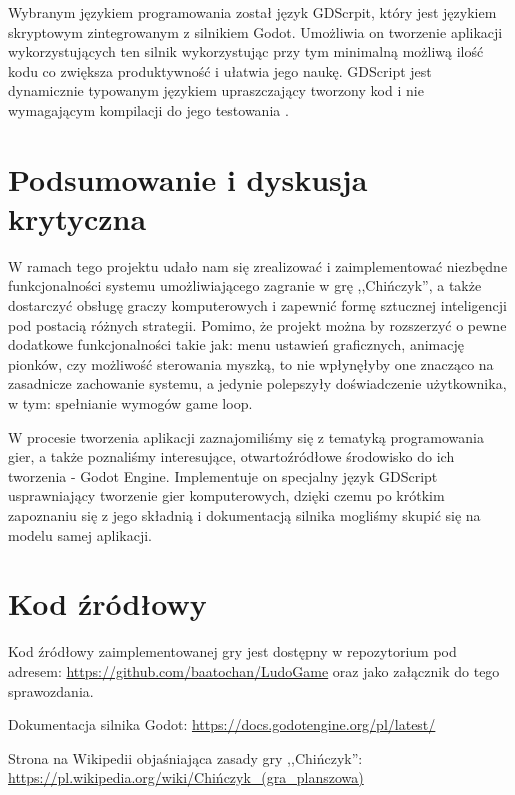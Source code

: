 \documentclass[conference]{IEEEtran}
\begin{document}
Wybranym językiem programowania został język GDScrpit, który jest językiem skryptowym zintegrowanym z silnikiem Godot. Umożliwia on tworzenie aplikacji wykorzystujących ten silnik wykorzystując przy tym minimalną możliwą ilość kodu co zwiększa produktywność i ułatwia jego naukę. GDScript jest dynamicznie typowanym językiem upraszczający tworzony kod i nie wymagającym kompilacji do jego testowania \cite{godot}.

\section{Podsumowanie i dyskusja krytyczna}
W ramach tego projektu udało nam się zrealizować i zaimplementować niezbędne funkcjonalności systemu umożliwiającego zagranie w grę ,,Chińczyk'', a także dostarczyć obsługę graczy komputerowych i zapewnić formę sztucznej inteligencji pod postacią różnych strategii. Pomimo, że projekt można by rozszerzyć o pewne dodatkowe funkcjonalności takie jak: menu ustawień graficznych, animację pionków, czy możliwość sterowania myszką, to nie wpłynęłyby one znacząco na zasadnicze zachowanie systemu, a jedynie polepszyły doświadczenie użytkownika, w tym: spełnianie wymogów game loop.


W procesie tworzenia aplikacji zaznajomiliśmy się z tematyką programowania gier, a także poznaliśmy interesujące, otwartoźródłowe środowisko do ich tworzenia - Godot Engine. Implementuje on specjalny język GDScript usprawniający tworzenie gier komputerowych, dzięki czemu po krótkim zapoznaniu się z jego składnią i dokumentacją silnika mogliśmy skupić się na modelu samej aplikacji.

\section*{Kod źródłowy}
Kod źródłowy zaimplementowanej gry jest dostępny w repozytorium pod adresem: \url{https://github.com/baatochan/LudoGame} oraz jako załącznik do tego sprawozdania.

\newpage

\begin{thebibliography}{00}
Dokumentacja silnika Godot: \url{https://docs.godotengine.org/pl/latest/}

Strona na Wikipedii objaśniająca zasady gry ,,Chińczyk'': \url{https://pl.wikipedia.org/wiki/Chińczyk\_(gra\_planszowa)}

\end{thebibliography}
\end{document}
